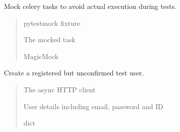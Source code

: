 \documentclass[letterpaper,10pt,openany,oneside,english]{sphinxmanual}
\begin{document}

\begin{savenotes}\begin{fulllineitems}
\label{\detokenize{modules/tests:storeapi.tests.conftest.mock_celery_tasks_fixture}}
\pysigstartsignatures
{}
\pysigstopsignatures
\sphinxAtStartPar
Mock celery tasks to avoid actual execution during tests.
\begin{quote}\begin{description}
\sphinxAtStartPar
{} \textendash{} pytest\sphinxhyphen{}mock fixture

\sphinxAtStartPar
The mocked task

\sphinxAtStartPar
MagicMock

\end{description}\end{quote}

\end{fulllineitems}\end{savenotes}


\begin{savenotes}\begin{fulllineitems}
\label{\detokenize{modules/tests:storeapi.tests.conftest.registered_user_fixture}}
\pysigstartsignatures
{}
\pysigstopsignatures
\sphinxAtStartPar
Create a registered but unconfirmed test user.
\begin{quote}\begin{description}
\sphinxAtStartPar
{} \textendash{} The async HTTP client

\sphinxAtStartPar
User details including email, password and ID

\sphinxAtStartPar
dict

\end{description}\end{quote}

\end{fulllineitems}\end{savenotes}
\end{document}
